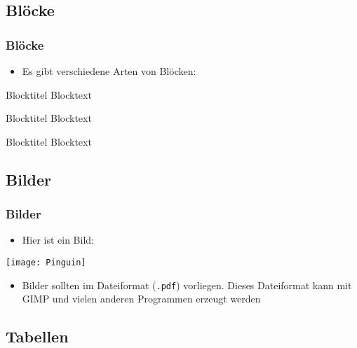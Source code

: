 \documentclass{beamer}
\begin{document}
\subsection{Blöcke}

\begin{frame}[t]
\frametitle{Blöcke}
\begin{itemize}
\item Es gibt verschiedene Arten von Blöcken:
\end{itemize}
\begin{block}{Blocktitel}
Blocktext
\end{block}

\begin{exampleblock}{Blocktitel}
Blocktext
\end{exampleblock}

\begin{alertblock}{Blocktitel}
Blocktext
\end{alertblock}
\end{frame}

\subsection{Bilder}

\begin{frame}
\frametitle{Bilder}
\begin{itemize}
\item Hier ist ein Bild:
\end{itemize}
\begin{center}
\texttt{[image: Pinguin]}
\end{center}
\begin{itemize}
\item Bilder sollten im Dateiformat (\texttt{.pdf}) vorliegen. Dieses Dateiformat kann mit GIMP und vielen anderen Programmen erzeugt werden
\end{itemize}
\end{frame}

\subsection{Tabellen}
\end{document}
